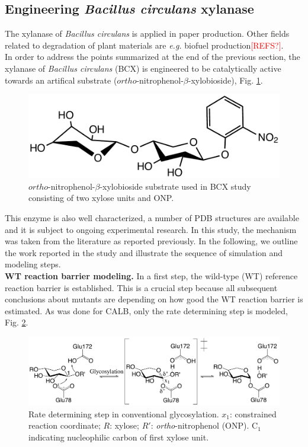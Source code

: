 \subsection{Engineering \textit{Bacillus circulans} xylanase}
The xylanase of \textit{Bacillus circulans} is applied in paper production\cite{bajpai1999application, buchert1994application}.
Other fields related to degradation of plant materials are \textit{e.g.} biofuel production\textcolor{red}{[REFS?]}.\\
In order to address the points summarized at the end of the previous section, the xylanase of \textit{Bacillus circulans} (BCX) is engineered to be catalytically active towards an artifical substrate ($ortho$-nitrophenol-$\beta$-xylobioside), Fig. \ref{fig:substrate}.
\begin{figure}[htbp] 
\centering
\includegraphics[width=0.85\linewidth]{substrate.pdf}
\caption{
$ortho$-nitrophenol-$\beta$-xylobioside substrate used in BCX study consisting of two xylose units and ONP.
}
\label{fig:substrate}
\end{figure}
This enzyme is also well characterized, a number of PDB structures are available and it is subject to ongoing experimental research\cite{ludwiczek2013strategies}.
In this study, the mechanism was taken from the literature as reported previously\cite{joshi2000hydrogen,joshi2001dissecting}.
In the following, we outline the work reported in the study and illustrate the sequence of simulation and modeling steps.\\
\textbf{WT reaction barrier modeling.}
In a first step, the wild-type (WT) reference reaction barrier is established.
This is a crucial step because all subsequent conclusions about mutants are depending on how good the WT reaction barrier is estimated.
As was done for CALB, only the rate determining step is modeled, Fig. \ref{fig:bcx_mechanism}.
\begin{figure}[htbp] 
\centering
\includegraphics[width=1.0\linewidth]{mechanism.pdf}
\caption{
Rate determining step in conventional glycosylation. $x_1$: constrained reaction coordinate; $R$: xylose; 
$R'$: \textit{ortho}-nitrophenol (ONP).
C$_1$ indicating nucleophilic carbon of first xylose unit\cite{hediger2013computational}.
}
\label{fig:bcx_mechanism}
\end{figure}
